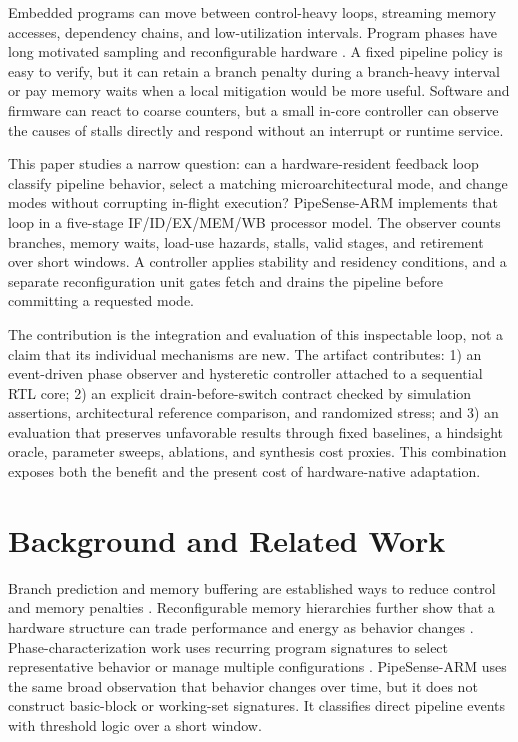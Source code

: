 \documentclass[conference]{IEEEtran}
\newcommand{\pipesense}{PipeSense-ARM}
\begin{document}
Embedded programs can move between control-heavy loops, streaming memory
accesses, dependency chains, and low-utilization intervals. Program phases
have long motivated sampling and reconfigurable hardware
\cite{sherwood2002phase,dhodapkar2002working}. A fixed pipeline policy is easy
to verify, but it can retain a branch penalty during a branch-heavy interval or
pay memory waits when a local mitigation would be more useful. Software and
firmware can react to coarse counters, but a small in-core controller can
observe the causes of stalls directly and respond without an interrupt or
runtime service.

This paper studies a narrow question: can a hardware-resident feedback loop
classify pipeline behavior, select a matching microarchitectural mode, and
change modes without corrupting in-flight execution? \pipesense{} implements
that loop in a five-stage IF/ID/EX/MEM/WB processor model. The observer counts
branches, memory waits, load-use hazards, stalls, valid stages, and retirement
over short windows. A controller applies stability and residency conditions,
and a separate reconfiguration unit gates fetch and drains the pipeline before
committing a requested mode.

The contribution is the integration and evaluation of this inspectable loop,
not a claim that its individual mechanisms are new. The artifact contributes:
1) an event-driven phase observer and hysteretic controller attached to a
sequential RTL core; 2) an explicit drain-before-switch contract checked by
simulation assertions, architectural reference comparison, and randomized
stress; and 3) an evaluation that preserves unfavorable results through fixed
baselines, a hindsight oracle, parameter sweeps, ablations, and synthesis cost
proxies. This combination exposes both the benefit and the present cost of
hardware-native adaptation.

\section{Background and Related Work}

Branch prediction and memory buffering are established ways to reduce control
and memory penalties \cite{smith1981branch,jouppi1990victim}. Reconfigurable
memory hierarchies further show that a hardware structure can trade
performance and energy as behavior changes
\cite{balasubramonian2000memory}. Phase-characterization work uses recurring
program signatures to select representative behavior or manage multiple
configurations \cite{sherwood2002phase,dhodapkar2002working}. \pipesense{}
uses the same broad observation that behavior changes over time, but it does
not construct basic-block or working-set signatures. It classifies direct
pipeline events with threshold logic over a short window.
\end{document}
